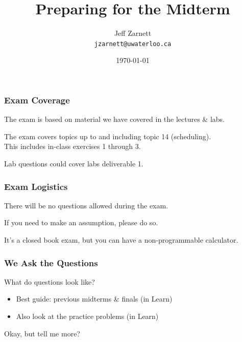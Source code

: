 

\title{ Preparing for the Midterm }

\author{Jeff Zarnett \\ \small \texttt{jzarnett@uwaterloo.ca}}
\date{\today}




\begin{frame}
  \titlepage

\end{frame}

\begin{frame}
\frametitle{Exam Coverage}

The exam is based on material we have covered in the lectures \& labs.

The exam covers topics up to and including topic 14 (scheduling).\\
\quad This includes in-class exercises 1 through 3.

Lab questions could cover labs deliverable 1.

\end{frame}

\begin{frame}
\frametitle{Exam Logistics}
There will be no questions allowed during the exam.

If you need to make an assumption, please do so. 

It's a closed book exam, but you can have a non-programmable calculator.

\end{frame}

\begin{frame}
\frametitle{We Ask the Questions}

What do questions look like?

\begin{itemize}
	\item Best guide: previous midterms \& finals (in Learn)
	\item Also look at the practice problems (in Learn)
\end{itemize}

Okay, but tell me more?

\end{frame}

